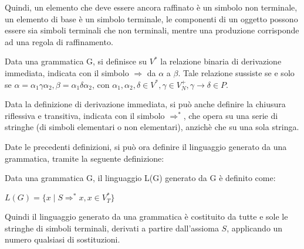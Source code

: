   Quindi, un elemento che deve essere ancora raffinato è un simbolo non terminale, un elemento di base è un simbolo terminale, le componenti di un oggetto possono essere sia simboli terminali che non terminali, mentre una produzione corrisponde ad una regola di raffinamento.

  \begin{definition}
    Data una grammatica G, si definisce su \(V^*\) la relazione binaria di derivazione immediata, indicata con il simbolo \(\Rightarrow\) da \(\alpha\) a \(\beta\). Tale relazione sussiste se e solo se \(\alpha=\alpha_1\gamma\alpha_2, \beta=\alpha_1\delta\alpha_2\), con \(\alpha_1, \alpha_2, \delta \in V^*, \gamma \in V_N^+, \gamma\to\delta\in P\).
  \end{definition}

  Data la definizione di derivazione immediata, si può anche definire la chiusura riflessiva e transitiva, indicata con il simbolo \(\Rightarrow^*\), che opera su una serie di stringhe (di simboli elementari o non elementari), anzichè che su una sola stringa.

  Date le precedenti definizioni, si può ora definire il linguaggio generato da una grammatica, tramite la seguente definizione:
  \begin{definition}
    Data una grammatica G, il linguaggio L(G) generato da G è definito come:

    \(L(G)=\{x\;|\;S\Rightarrow^*x, x\in V_T^*\}\)
  \end{definition}

  Quindi il linguaggio generato da una grammatica è costituito da tutte e sole le stringhe di simboli terminali, derivati a partire dall'assioma \(S\), applicando un numero qualsiasi di sostituzioni.

